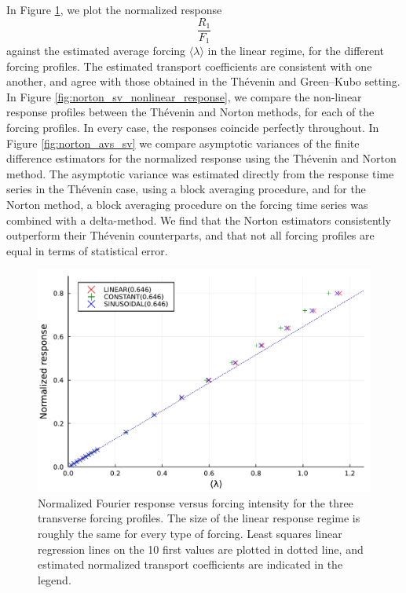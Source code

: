 In Figure \ref{fig:norton_sv_linear_response}, we plot the normalized response \[\frac{R_1}{F_1}\] against the estimated average forcing $\langle \lambda \rangle$ in the linear regime, for the different forcing profiles.
The estimated transport coefficients are consistent with one another, and agree with those obtained in the Thévenin and Green--Kubo setting.
In Figure \ref{fig:norton_sv_nonlinear_response}, we compare the non-linear response profiles between the Thévenin and Norton methods, for each of the forcing profiles. In every case, the responses coincide perfectly throughout.
In Figure \ref{fig:norton_avs_sv} we compare asymptotic variances of the finite difference estimators for the normalized response using the Thévenin and Norton method. The asymptotic variance was estimated directly from the response time series in the Thévenin case, using a block averaging procedure,
and for the Norton method, a block averaging procedure on the forcing time series was combined with a delta-method. We find that the Norton estimators consistently outperform their Thévenin counterparts, and that not all forcing profiles are equal in terms of statistical error.
\begin{figure}[htbp]
  \begin{center}
    \includegraphics[width=0.9\linewidth]{figures/norton_sv_lin.pdf}
    \caption{ \label{fig:norton_sv_linear_response}
      Normalized Fourier response versus forcing intensity for the three transverse forcing profiles.
      The size of the linear response regime is roughly the same for every type of forcing. Least squares linear regression lines on the 10 first values are plotted in dotted line, and estimated normalized transport coefficients are indicated in the legend.
    }
  \end{center}
\end{figure}
